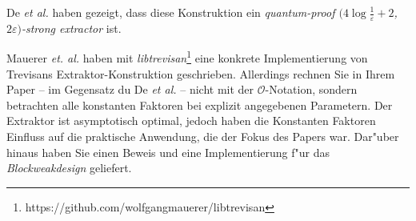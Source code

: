 De \emph{et al.} \cite{de2012trevisan} haben gezeigt, dass diese Konstruktion ein \emph{quantum-proof $(4 \log \frac{1}{\varepsilon} + 2$, $2\varepsilon)$-strong extractor} ist.

Mauerer \emph{et. al.} haben mit \emph{libtrevisan}\footnote{https://github.com/wolfgangmauerer/libtrevisan} eine konkrete Implementierung von Trevisans Extraktor-Konstruktion \cite{trevisan2001extractors} geschrieben. Allerdings rechnen Sie in Ihrem Paper \cite{mauerer2012modular} -- im Gegensatz du De \emph{et al.} -- nicht mit der $\mathcal O$-Notation, sondern betrachten alle konstanten Faktoren bei explizit angegebenen Parametern. Der Extraktor ist asymptotisch optimal, jedoch haben die Konstanten Faktoren Einfluss auf die praktische Anwendung, die der Fokus des Papers war. Dar"uber hinaus haben Sie einen Beweis und eine Implementierung f"ur das \emph{Blockweakdesign} geliefert.
